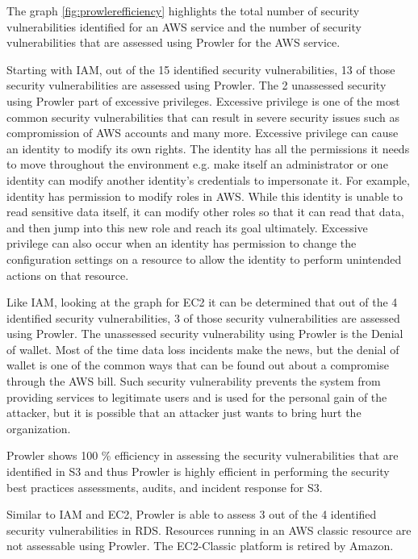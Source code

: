 \par The graph \ref{fig:prowlerefficiency} highlights the total number of security vulnerabilities identified for an AWS service and the number of security vulnerabilities that are assessed using Prowler for the AWS service.

\par Starting with IAM, out of the 15 identified security vulnerabilities, 13 of those security vulnerabilities are
assessed using Prowler. The 2 unassessed security using Prowler part of excessive privileges. Excessive privilege is
one of the most common security vulnerabilities that can result in severe security issues such as compromission of
AWS accounts and many more. Excessive privilege can cause an identity to modify its own rights. The identity has all
the permissions it needs to move throughout the environment e.g. make itself an administrator or one identity can
modify another identity’s credentials to impersonate it. For example, identity has permission to modify roles in AWS.
While this identity is unable to read sensitive data itself, it can modify other roles so that it can read that data,
and then jump into this new role and reach its goal ultimately. Excessive privilege can also occur when an identity
has permission to change the configuration settings on a resource to allow the identity to perform unintended actions
on that resource.

\par Like IAM, looking at the graph for EC2 it can be determined that out of the 4 identified security vulnerabilities, 3 of those security vulnerabilities are assessed using Prowler.  The unassessed security vulnerability using Prowler is the Denial of wallet. Most of the time data loss incidents make the news, but the denial of wallet is one of the common ways that can be found out about a compromise through the AWS bill. Such security vulnerability prevents the system from providing services to legitimate users and is used for the personal gain of the attacker, but it is possible that an attacker just wants to bring hurt the organization.

\par Prowler shows 100 \% efficiency in assessing the security vulnerabilities that are identified in S3 and thus Prowler is highly efficient in performing the security best practices assessments, audits, and incident response for S3.

\par Similar to IAM and EC2, Prowler is able to assess 3 out of the 4 identified security vulnerabilities in RDS. Resources running in an AWS classic resource are not assessable using Prowler. The EC2-Classic platform is retired by Amazon.

